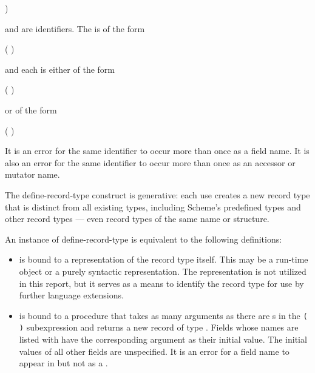 \begin{entry}{
)}

\syntax
{} and  are identifiers.
The  is of the form
\begin{scheme}
(  \dotsfoo)
\end{scheme}
and each  is either of the form
\begin{scheme}
( )
\end{scheme}
or of the form
\begin{scheme}
(  )
\end{scheme}

It is an error for the same identifier to occur more than once as a
field name.
It is also an error for the same identifier to occur more than once
as an accessor or mutator name.

The {\cf define-record-type} construct is generative: each use creates a new record
type that is distinct from all existing types, including Scheme's
predefined types and other record types --- even record types of
the same name or structure.

An instance of {\cf define-record-type} is equivalent to the following
definitions:

\begin{itemize}

\item {} is bound to a representation of the record type itself.
This may be a run-time object or a purely syntactic representation.
The representation is not utilized in this report, but it serves as a
means to identify the record type for use by further language extensions.

\item {} is bound to a procedure that takes as
  many arguments as there are s in the
  \texttt{( \dotsfoo)} subexpression and returns a
  new record of type .  Fields whose names are listed with
   have the corresponding argument as their
  initial value.  The initial values of all other fields are
  unspecified.  It is an error for a field name to appear in
   but not as a .


\end{itemize}
\end{entry}
